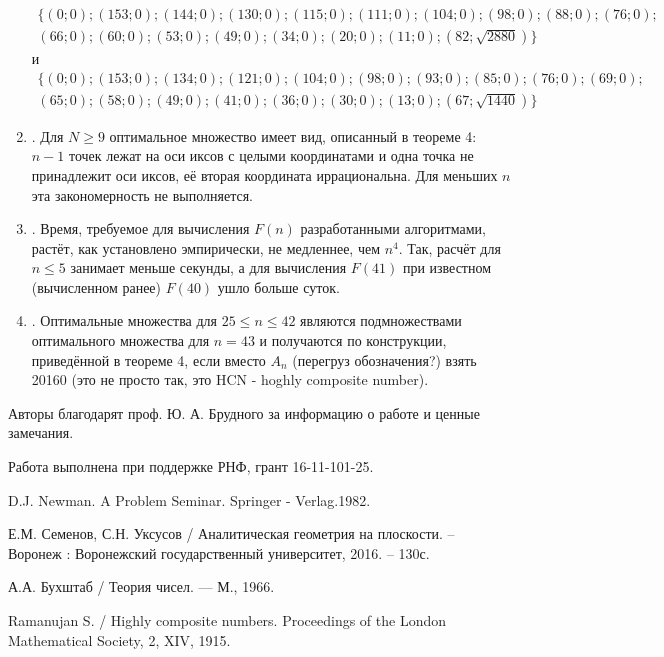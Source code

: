 \documentclass[a4paper,14pt]{article} %
\begin{document}
\begin{enumerate}
\begin{multline*}
\{( 0 ; 0 ); ( 153 ; 0 ); ( 144 ; 0 ); ( 130 ; 0 ); ( 115 ; 0 ); ( 111 ; 0 ); ( 104 ; 0 ); ( 98 ; 0 ); ( 88 ; 0 ); ( 76 ; 0 );\\
( 66 ; 0 ); ( 60 ; 0 ); ( 53 ; 0 ); ( 49 ; 0 ); ( 34 ; 0 ); ( 20 ; 0 ); ( 11 ; 0 ); ( 82 ; \sqrt{2880})\}
\end{multline*}
и
\begin{multline*}
\{( 0 ; 0 ); ( 153 ; 0 ); ( 134 ; 0 ); ( 121 ; 0 ); ( 104 ; 0 ); ( 98 ; 0 ); ( 93 ; 0 ); ( 85 ; 0 ); ( 76 ; 0 ); ( 69 ; 0 );\\
( 65 ; 0 ); ( 58 ; 0 ); ( 49 ; 0 ); ( 41 ; 0 ); ( 36 ; 0 ); ( 30 ; 0 ); ( 13 ; 0 ); ( 67 ; \sqrt{1440} )\}
\end{multline*}

\item.
Для $N \geq 9$ оптимальное множество имеет вид, описанный в теореме 4:
$n-1$ точек лежат на оси иксов с целыми координатами и одна точка не принадлежит оси иксов, её вторая координата иррациональна.
Для меньших $n$ эта закономерность не выполняется.

\item.
Время, требуемое для вычисления $F(n)$ разработанными алгоритмами, растёт, как установлено эмпирически, не медленнее, чем $n^4$.
Так, расчёт для $n \leq 5$ занимает меньше секунды, а для вычисления $F(41)$ при известном (вычисленном ранее) $F(40)$ ушло больше суток.

\item.
Оптимальные множества для $ 25 \leq n \leq 42$ являются подмножествами оптимального множества для $n=43$ и получаются по конструкции, приведённой в теореме 4, если вместо $A_n$ (перегруз обозначения?) взять 20160 (это не просто так, это HCN - hoghly composite number).

\end{enumerate}

Авторы благодарят проф. Ю. А. Брудного за информацию о работе \cite{Newman} и ценные замечания.

Работа выполнена при поддержке РНФ, грант 16-11-101-25.


\begin{thebibliography}{99}

 D.J. Newman. A Problem Seminar. Springer - Verlag.1982.

 Е.М. Семенов, С.Н. Уксусов / Аналитическая геометрия на плоскости. – Воронеж : Воронежский государственный университет, 2016. – 130с.

 А.А. Бухштаб / Теория чисел. --- М., 1966.

 Ramanujan S. / Highly composite numbers. Proceedings of the London Mathematical Society, 2, XIV, 1915.

\end{thebibliography}
\end{document}
